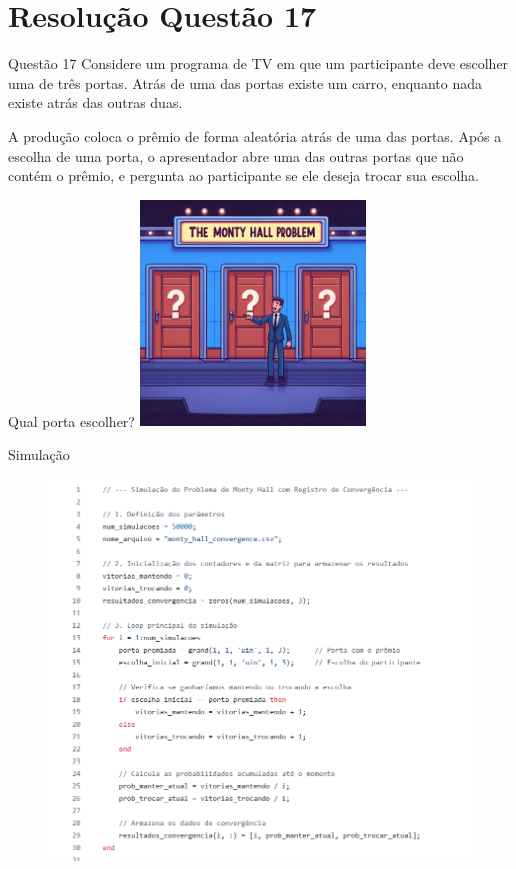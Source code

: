\section{Resolução Questão 17}

\begin{frame}{Questão 17}
Considere um programa de TV em que um participante deve escolher uma de três portas. Atrás de uma das portas existe um carro, enquanto nada existe atrás das outras duas.

\vspace{0.3cm}
A produção coloca o prêmio de forma aleatória atrás de uma das portas. Após a escolha de uma porta, o apresentador abre uma das outras portas que não contém o prêmio, e pergunta ao participante se ele deseja trocar sua escolha.
\end{frame}

\begin{frame}{Qual porta escolher?}
\centering
\includegraphics[width=0.45\textwidth]{figures/MontyHall.jpeg}
\end{frame}

\begin{frame}[fragile]{Simulação}
 \begin{figure}
    \centering
    \includegraphics[width=0.9\linewidth]{figures/Captura de tela 2025-07-18 154707.png}
 \end{figure}
\end{frame}

